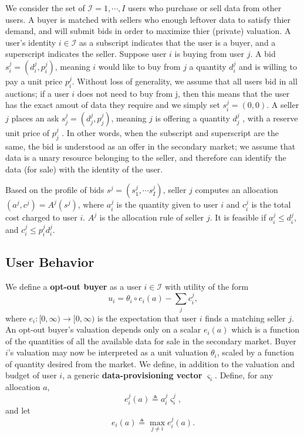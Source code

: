 \documentclass[12pt]{article}
\theoremstyle{definition}
\newcommand{\vs}{\varsigma}
\begin{document}
\begin{multicols}{2}
We consider the set of $\mathcal{I} = {1, \cdots, I}$ users who purchase or sell
data from other users. A buyer is matched with sellers who enough leftover data
to satisfy thier demand, and will submit bids in order to maximize thier (private) valuation.
A user's identity $i \in \mathcal{I}$ as a subscript indicates that the user
is a buyer, and a superscript indicates the seller.
Suppose user $i$ is buying from user $j$. A bid $s_i^j = (d_i^j, p_i^j)$,
meaning $i$ would like to buy from $j$ a quantity $d^j_i$ and is willing to pay
a unit price $p^j_i$. Without loss of generality, we assume that all users bid in all
auctions; if a user $i$ does not need to buy from j, then this means that the
user has the exact amout of data they require and we simply set $s^j_i = (0, 0)$.
A seller $j$ places an ask $s_j^j = (d_j^j, p_j^j)$, meaning $j$ is offering a
quantity $d_j^j$ , with a reserve unit price of $p_j^j$ . In other words, when the subscript and
superscript are the same, the bid is understood as an offer in the secondary
market; we assume that data is a unary resource belonging to the seller, and
therefore can identify the data (for sale) with the identity of the user.

Based on the profile of bids $s^j = (s^j_1, \cdots s^j_I)$, seller $j$ computes an
allocation $(a^j, c^j) = A^j(s^j)$, where $a^j_i$ is the quantity given to user
$i$ and $c^j_i$ is the total cost charged to user $i$. $A^j$ is the allocation
rule of seller $j$. It is feasible if $a^j_i \le d_i^j$, and $c^j_i \le  p^j_i
d_i^j$.

\subsection{User Behavior}

We define a \textbf{opt-out buyer} as a user $i\in\mathcal{I}$ with utility of
the form 
\begin{equation}
    u_i = \theta_i \circ e_i(a) - \displaystyle\sum_j c_i^j,
\end{equation}
where $e_i : [0, \infty) \rightarrow [0,\infty)$ is the expectation that user
$i$ finds a matching seller $j$. An opt-out buyer's valuation
depends only on a scalar $e_i(a)$ which is a function of the
quantities of all the available data for sale in the secondary market. Buyer
$i$'s valuation may now be interpreted as a unit valuation $\theta_i$, scaled
by a function of quantity desired from the market. 
We define, in addition to the valuation and budget of user $i$, a generic
\textbf{data-provisioning vector} $\vs_i$.  Define, for any allocation $a$,
\begin{equation}\label{opt-out}
    e_i^j(a) \triangleq a_i^j\vs_i^j,
\end{equation}
and let
\begin{equation}
    e_i(a) \triangleq \max_{j\ne i} e_i^j(a).
\end{equation}


\end{multicols}
\end{document}
